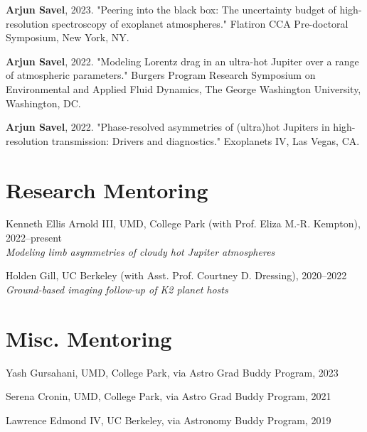 \documentclass[letterpaper,12pt]{article}
\newcommand{\resumeSubHeadingListStart}{\begin{itemize}[leftmargin=*]}
\newcommand{\shorterSection}[1]{\vspace{-10pt}\section{#1}}
\begin{document}
\small
  \begin{list}{}{\cvlist}
  

  \item[{\color{numcolor}\scriptsize3}] \textbf{Arjun Savel}, 2023. "Peering into the black box: 
The uncertainty budget of high-resolution spectroscopy of exoplanet atmospheres." Flatiron CCA Pre-doctoral Symposium, New York, NY.


  \item[{\color{numcolor}\scriptsize2}] \textbf{Arjun Savel}, 2022. "Modeling Lorentz drag in an ultra-hot Jupiter over a range of atmospheric parameters." Burgers Program Research Symposium on Environmental and Applied Fluid Dynamics, The George Washington University, Washington, DC.

     \item[{\color{numcolor}\scriptsize1}] \textbf{Arjun Savel}, 2022. "Phase-resolved asymmetries of (ultra)hot Jupiters in high-resolution transmission: Drivers and diagnostics." Exoplanets IV, Las Vegas, CA.





\end{list}

\shorterSection{Research Mentoring}
\small
  \begin{list}{}{\cvlist}  
  \item[{\color{numcolor}}]Kenneth Ellis Arnold III, UMD, College Park (with Prof. Eliza M.-R. Kempton), 2022--present \\
  \textit{Modeling limb asymmetries of cloudy hot Jupiter atmospheres}
  \item[{\color{numcolor}}]Holden Gill, UC Berkeley (with Asst. Prof. Courtney D. Dressing), 2020--2022 \\
    \textit{Ground-based imaging follow-up of K2 planet hosts}


  \end{list}

\shorterSection{Misc. Mentoring}
\small
  \begin{list}{}{\cvlist}
  \item[{\color{numcolor}}]Yash Gursahani, UMD, College Park, via Astro Grad Buddy Program, 2023
  \item[{\color{numcolor}}]Serena Cronin, UMD, College Park, via Astro Grad Buddy Program, 2021 
  \item[{\color{numcolor}}]Lawrence Edmond IV, UC Berkeley, via Astronomy Buddy Program, 2019


  \end{list} 
\end{document}
